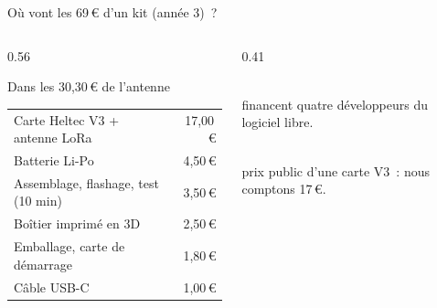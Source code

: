 \begin{frame}{Où vont les 69\,€ d'un kit (année 3)~?}
  \vspace{-0.3cm}
  \begin{columns}[T]
    \begin{column}{0.56\textwidth}
      \begin{encadre}{Dans les 30,30\,€ de l'antenne}
        \footnotesize\renewcommand{\arraystretch}{0.95}
        \begin{tabularx}{\linewidth}{@{}Xr@{}}
          Carte Heltec V3 + antenne LoRa   & 17,00\,€ \\
          Batterie Li-Po                   & 4,50\,€ \\
          Assemblage, flashage, test (10 min) & 3,50\,€ \\
          Boîtier imprimé en 3D            & 2,50\,€ \\
          Emballage, carte de démarrage    & 1,80\,€ \\
          Câble USB-C                      & 1,00\,€ \\
        \end{tabularx}
      \end{encadre}
    \end{column}
    \begin{column}{0.41\textwidth}
      \begin{carte}[height=1.58cm,valign=top]
        \raggedright
        \\[1pt]
        {\footnotesize financent quatre développeurs du logiciel libre.}
      \end{carte}
      \vspace{0.1cm}
      \begin{carte}[height=1.58cm,valign=top]
        \raggedright
        \\[1pt]
        {\footnotesize prix public d'une carte V3~: nous comptons 17\,€.}
      \end{carte}
    \end{column}
  \end{columns}
\end{frame}

